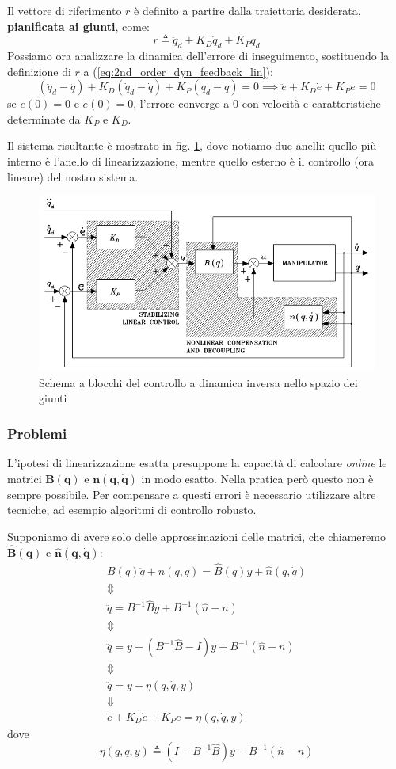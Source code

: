\boldmath
Il vettore di riferimento $r$ è definito a partire dalla traiettoria desiderata, \textbf{pianificata ai giunti}, come:
$$
r \triangleq \ddot{q}_d + K_D \dot{q}_d + K_P q_d 
$$
Possiamo ora analizzare la dinamica dell'errore di inseguimento, sostituendo la definizione di $r$ a (\ref{eq:2nd_order_dyn_feedback_lin}):
$$
(\ddot{q}_d - \ddot{q}) + K_D(\dot{q}_d - \dot{q}) + K_P(q_d - q) = 0
\implies
\ddot{e} + K_D\dot{e} + K_Pe = 0
$$
se $e(0) = 0$ e $\dot{e}(0) = 0$, l'errore converge a 0 con velocità e caratteristiche determinate da $K_P$ e $K_D$.
\unboldmath

Il sistema risultante è mostrato in fig. \ref{fig:centralizedcontrol2}, dove notiamo due anelli: quello più interno è l'anello di linearizzazione, mentre quello esterno è il controllo (ora lineare) del nostro sistema.

\begin{figure}
	\centering
	\includegraphics[width=0.7\linewidth]{images/centralized_control_2}
	\caption{Schema a blocchi del controllo a dinamica inversa nello spazio dei giunti}
	\label{fig:centralizedcontrol2}
\end{figure}


\vspace*{20pt}
\subsubsection{Problemi}
L’ipotesi di linearizzazione esatta presuppone la capacità di calcolare \textit{online} le matrici $\mathbf{B(q)}$ e $\mathbf{n(q, \dot{q})}$ in modo esatto. Nella pratica però questo non è sempre possibile.
Per compensare a questi errori è necessario utilizzare altre tecniche, ad esempio algoritmi di controllo robusto.

Supponiamo di avere solo delle approssimazioni delle matrici, che chiameremo $\mathbf{\hat{B}(q)}$ e $\mathbf{\hat{n}(q, \dot{q})}$:
\boldmath
\begin{gather*}
B(q)\ddot{q} + n(q, \dot{q}) = \hat{B}(q)y + \hat{n}(q, \dot{q}) \\
\Updownarrow \\
\ddot{q} = B^{-1}\hat{B}y + B^{-1}(\hat{n} - n) \\
\Updownarrow \\
\ddot{q} = y + (B^{-1}\hat{B} - I)y + B^{-1}(\hat{n} - n) \\
\Updownarrow \\
\ddot{q} = y - \eta(q, \dot{q}, y) \\
\Downarrow \\
\ddot{e} + K_D\dot{e} + K_Pe = \eta(q, \dot{q}, y)
\end{gather*}
dove
$$
\eta(q, \dot{q}, y) \triangleq (I - B^{-1}\hat{B})y - B^{-1}(\hat{n} - n)
$$

